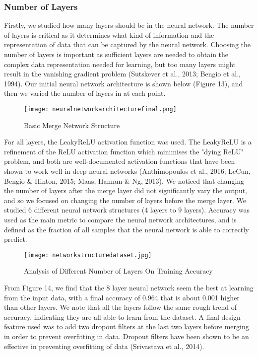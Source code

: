 \documentclass{article}
\begin{document}
\subsubsection{Number of Layers}
Firstly, we studied how many layers should be in the neural network. The number of layers is critical as it determines what kind of information and the representation of data that can be captured by the neural network. Choosing the number of layers is important as sufficient layers are needed to obtain the complex data representation needed for learning, but too many layers might result in the vanishing gradient problem (Sutskever et al., 2013; Bengio et al., 1994). Our initial neural network architecture is shown below (Figure 13), and then we varied the number of layers in at each point.
\begin{figure}[H]
\texttt{[image: neuralnetworkarchitecturefinal.png]}
\centering
\caption{Basic Merge Network Structure}
\end{figure}
For all layers, the LeakyReLU activation function was used. The LeakyReLU is a refinement of the ReLU activation function which minimises the "dying ReLU" problem, and both are well-documented activation functions that have been shown to work well in deep neural networks (Anthimopoulos et al., 2016; LeCun, Bengio \& Hinton, 2015; Maas, Hannun \& Ng, 2013). We noticed that changing the number of layers after the merge layer did not significantly vary the output, and so we focused on changing the number of layers before the merge layer. We studied 6 different neural network structures (4 layers to 9 layers). Accuracy was used as the main metric to compare the neural network architectures, and is defined as the fraction of all samples that the neural network is able to correctly predict.
\begin{figure}[H]
\texttt{[image: networkstructuredataset.jpg]}
\centering
\caption{Analysis of Different Number of Layers On Training Accuracy}
\end{figure}
From Figure 14, we find that the 8 layer neural network seem the best at learning from the input data, with a final accuracy of 0.964 that is about 0.001 higher than other layers. We note that all the layers follow the same rough trend of accuracy, indicating they are all able to learn from the dataset.  A final design feature used was to add two dropout filters at the last two layers before merging in order to prevent overfitting in data. Dropout filters have been shown to be an effective in preventing overfitting of data (Srivastava et al., 2014).\\\\
\end{document}

